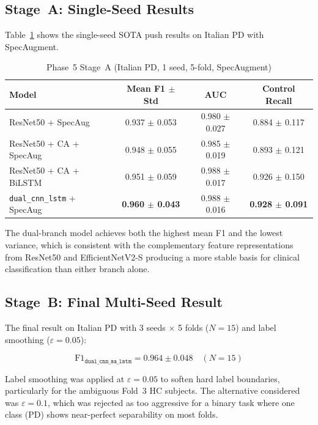 \documentclass[oneside,openany]{final_report}
\begin{document}
\subsection{Stage~A: Single-Seed Results}

Table~\ref{tab:stage_a} shows the single-seed SOTA push results on Italian PD with SpecAugment.

\begin{table}[H]
\centering
\caption{Phase~5 Stage~A (Italian PD, 1 seed, 5-fold, SpecAugment)}
\label{tab:stage_a}
\begin{tabular}{l c c c}
\toprule
\textbf{Model} & \textbf{Mean F1 $\pm$ Std} & \textbf{AUC} & \textbf{Control Recall} \\
\midrule
ResNet50 + SpecAug & 0.937 $\pm$ 0.053 & 0.980 $\pm$ 0.027 & 0.884 $\pm$ 0.117 \\
ResNet50 + CA + SpecAug & 0.948 $\pm$ 0.055 & 0.985 $\pm$ 0.019 & 0.893 $\pm$ 0.121 \\
ResNet50 + CA + BiLSTM & 0.951 $\pm$ 0.059 & 0.988 $\pm$ 0.017 & 0.926 $\pm$ 0.150 \\
\texttt{dual\_cnn\_lstm} + SpecAug & \textbf{0.960 $\pm$ 0.043} & 0.988 $\pm$ 0.016 & \textbf{0.928 $\pm$ 0.091} \\
\bottomrule
\end{tabular}
\end{table}

The dual-branch model achieves both the highest mean F1 and the lowest variance, which is consistent with the complementary feature representations from ResNet50 and EfficientNetV2-S producing a more stable basis for clinical classification than either branch alone.

\subsection{Stage~B: Final Multi-Seed Result}

The final result on Italian PD with 3 seeds $\times$ 5 folds ($N\!=\!15$) and label smoothing ($\varepsilon\!=\!0.05$):

\begin{equation}
    \text{F1}_{\texttt{dual\_cnn\_sa\_lstm}} = 0.964 \pm 0.048 \quad (N = 15)
\end{equation}

Label smoothing was applied at $\varepsilon\!=\!0.05$ to soften hard label boundaries, particularly for the ambiguous Fold~3 HC subjects. The alternative considered was $\varepsilon\!=\!0.1$, which was rejected as too aggressive for a binary task where one class (PD) shows near-perfect separability on most folds.
\end{document}
